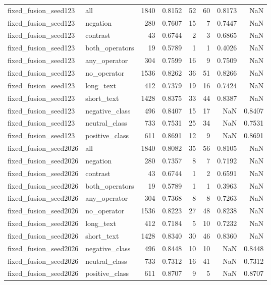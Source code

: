 \begin{tabular}{llrrrrrr}
fixed\_fusion\_seed123 & all & 1840 & 0.8152 & 52 & 60 & 0.8173 & NaN \\
fixed\_fusion\_seed123 & negation & 280 & 0.7607 & 15 & 7 & 0.7447 & NaN \\
fixed\_fusion\_seed123 & contrast & 43 & 0.6744 & 2 & 3 & 0.6865 & NaN \\
fixed\_fusion\_seed123 & both\_operators & 19 & 0.5789 & 1 & 1 & 0.4026 & NaN \\
fixed\_fusion\_seed123 & any\_operator & 304 & 0.7599 & 16 & 9 & 0.7509 & NaN \\
fixed\_fusion\_seed123 & no\_operator & 1536 & 0.8262 & 36 & 51 & 0.8266 & NaN \\
fixed\_fusion\_seed123 & long\_text & 412 & 0.7379 & 19 & 16 & 0.7424 & NaN \\
fixed\_fusion\_seed123 & short\_text & 1428 & 0.8375 & 33 & 44 & 0.8387 & NaN \\
fixed\_fusion\_seed123 & negative\_class & 496 & 0.8407 & 15 & 17 & NaN & 0.8407 \\
fixed\_fusion\_seed123 & neutral\_class & 733 & 0.7531 & 25 & 34 & NaN & 0.7531 \\
fixed\_fusion\_seed123 & positive\_class & 611 & 0.8691 & 12 & 9 & NaN & 0.8691 \\
fixed\_fusion\_seed2026 & all & 1840 & 0.8082 & 35 & 56 & 0.8105 & NaN \\
fixed\_fusion\_seed2026 & negation & 280 & 0.7357 & 8 & 7 & 0.7192 & NaN \\
fixed\_fusion\_seed2026 & contrast & 43 & 0.6744 & 1 & 2 & 0.6591 & NaN \\
fixed\_fusion\_seed2026 & both\_operators & 19 & 0.5789 & 1 & 1 & 0.3963 & NaN \\
fixed\_fusion\_seed2026 & any\_operator & 304 & 0.7368 & 8 & 8 & 0.7263 & NaN \\
fixed\_fusion\_seed2026 & no\_operator & 1536 & 0.8223 & 27 & 48 & 0.8238 & NaN \\
fixed\_fusion\_seed2026 & long\_text & 412 & 0.7184 & 5 & 10 & 0.7232 & NaN \\
fixed\_fusion\_seed2026 & short\_text & 1428 & 0.8340 & 30 & 46 & 0.8360 & NaN \\
fixed\_fusion\_seed2026 & negative\_class & 496 & 0.8448 & 10 & 10 & NaN & 0.8448 \\
fixed\_fusion\_seed2026 & neutral\_class & 733 & 0.7312 & 16 & 41 & NaN & 0.7312 \\
fixed\_fusion\_seed2026 & positive\_class & 611 & 0.8707 & 9 & 5 & NaN & 0.8707 \\

\end{tabular}
